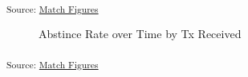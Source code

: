 \documentclass[
  letterpaper,
  DIV=11,
  numbers=noendperiod]{scrartcl}
\begin{document}
\textsubscript{Source:
\href{https://jjcurtin.github.io/lectures_science/notebooks/match_figs-preview.html\#cell-fig-tx_week_1}{Match
Figures}}

\begin{figure}[H]


\caption{\label{fig-tx_week_2}Abstince Rate over Time by Tx Received}

\end{figure}%

\textsubscript{Source:
\href{https://jjcurtin.github.io/lectures_science/notebooks/match_figs-preview.html\#cell-fig-tx_week_2}{Match
Figures}}
\end{document}
